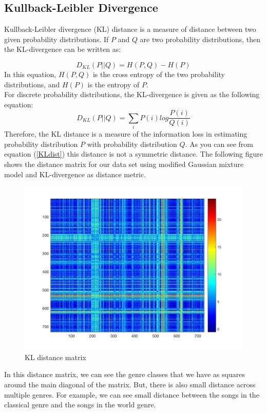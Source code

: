 \documentclass[12pt]{article}
\begin{document}
\subsection{Kullback-Leibler Divergence}
Kullback-Leibler divergence (KL) distance is a measure of distance between two given probability distributions. If $P$ and $Q$ are two probability distributions, then the KL-divergence can be written as:

\begin{equation}\label{KLdist}
D_{KL}(P||Q) = H(P,Q) - H(P)
\end{equation}
In this equation, $H(P,Q)$ is the cross entropy of the two probability distributions, and $H(P)$ is the entropy of $P$. \\
For discrete probability distributions, the KL-divergence is given as the following equation:
\begin{equation}\label{KLdist}
D_{KL}(P||Q) = \sum_i P(i) log \frac{P(i)}{Q(i)}
\end{equation}
Therefore, the KL distance is a measure of the information loss in estimating probability distribution $P$ with probability distribution $Q$. As you can see from equation (\ref{KLdist}) this distance is not a symmetric distance. The following figure shows the distance matrix for our data set using modified Gaussian mixture model and KL-divergence as distance metric.
\begin{figure}[H]\label{KLDiv}
	\centering
	\includegraphics[width=1\linewidth]{KLDiv.jpg}
	\caption{KL distance matrix}
\end{figure}
In this distance matrix, we can see the genre classes that we have as squares around the main diagonal of the matrix. But, there is also small distance across multiple genres. For example, we can see small distance between the songs in the classical genre and the songs in the world genre.
\end{document}
